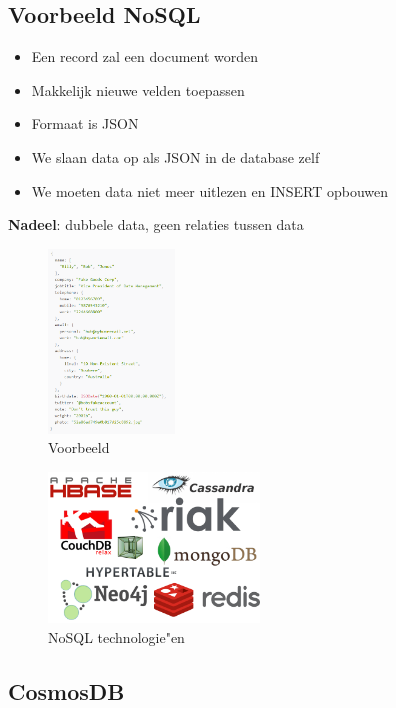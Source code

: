 \documentclass{article}
\newcommand{\bold}[1]{\textbf{#1}}
\begin{document}
\subsection{Voorbeeld NoSQL}

\begin{itemize}
    \item Een record zal een document worden
    \item Makkelijk nieuwe velden toepassen
    \item Formaat is JSON
    \item We slaan data op als JSON in de database zelf
    \item We moeten data niet meer uitlezen en INSERT opbouwen
\end{itemize}

\bold{Nadeel}: dubbele data, geen relaties tussen data

\begin{figure}[H]
    \centering
    \includegraphics[width=0.3\textwidth]{nosql.png}
    \caption{Voorbeeld}
\end{figure}

\begin{figure}[H]
    \centering
    \includegraphics[width=0.5\textwidth]{nosql-techs.png}
    \caption{NoSQL technologie"en}
\end{figure}

\subsection{CosmosDB}
\end{document}
